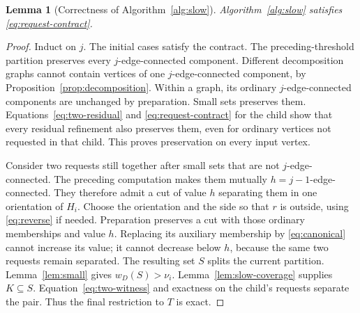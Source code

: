 \documentclass[11pt]{article}
\newtheorem{lemma}[theorem]{Lemma}
\theoremstyle{definition}
\theoremstyle{remark}
\begin{document}
\begin{lemma}[Correctness of Algorithm~\ref{alg:slow}]
\label{lem:slow-correct}
Algorithm~\ref{alg:slow} satisfies \eqref{eq:request-contract}.
\end{lemma}
\begin{proof}
Induct on \(j\). The initial cases satisfy the contract. The preceding-threshold partition preserves every \(j\)-edge-connected component. Different decomposition graphs cannot contain vertices of one \(j\)-edge-connected component, by Proposition~\ref{prop:decomposition}. Within a graph, its ordinary \(j\)-edge-connected components are unchanged by preparation. Small sets preserves them. Equations~\eqref{eq:two-residual} and \eqref{eq:request-contract} for the child show that every residual refinement also preserves them, even for ordinary vertices not requested in that child. This proves preservation on every input vertex.

Consider two requests still together after small sets that are not \(j\)-edge-connected. The preceding computation makes them mutually \(h=j-1\)-edge-connected. They therefore admit a cut of value \(h\) separating them in one orientation of \(H_i\). Choose the orientation and the side so that \(r\) is outside, using \eqref{eq:reverse} if needed. Preparation preserves a cut with those ordinary memberships and value \(h\). Replacing its auxiliary membership by \eqref{eq:canonical} cannot increase its value; it cannot decrease below \(h\), because the same two requests remain separated. The resulting set \(S\) splits the current partition. Lemma~\ref{lem:small} gives \(w_D(S)>\nu_i\). Lemma~\ref{lem:slow-coverage} supplies \(K\subseteq S\). Equation~\eqref{eq:two-witness} and exactness on the child's requests separate the pair. Thus the final restriction to \(T\) is exact.
\end{proof}
\end{document}
